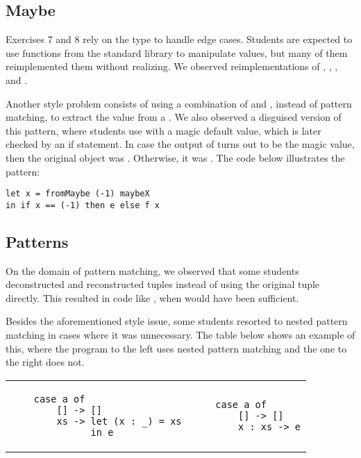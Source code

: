 \subsection{Maybe}

Exercises 7 and 8 rely on the  type to handle edge cases. Students are expected to use functions from the standard library to manipulate  values, but many of them reimplemented them without realizing. We observed reimplementations of , , ,  and .

Another style problem consists of using a combination of  and , instead of pattern matching, to extract the value from a . We also observed a disguised version of this pattern, where students use  with a magic default value, which is later checked by an if statement. In case the output of  turns out to be the magic value, then the original  object was . Otherwise, it was . The code below illustrates the pattern:

\begin{verbatim}
let x = fromMaybe (-1) maybeX
in if x == (-1) then e else f x
\end{verbatim}


\subsection{Patterns}

On the domain of pattern matching, we observed that some students deconstructed and reconstructed tuples instead of using the original tuple directly. This resulted in code like , when  would have been sufficient.

Besides the aforementioned style issue, some students resorted to nested pattern matching in cases where it was unnecessary. The table below shows an example of this, where the program to the left uses nested pattern matching and the one to the right does not.

\begin{center}
\begin{tabular}{ m{17em} | m{13em} }
    \begin{verbatim}
    case a of
        [] -> []
        xs -> let (x : _) = xs
              in e
    \end{verbatim}
    &
    \begin{verbatim}
    case a of
        [] -> []
        x : xs -> e
    \end{verbatim}
\end{tabular}
\end{center}

